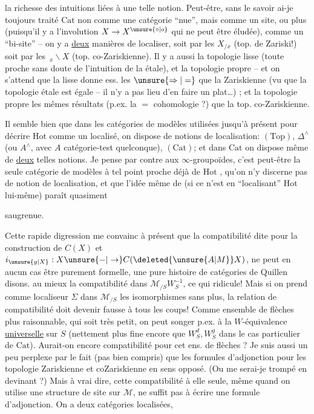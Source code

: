  la richesse des intuitions liées à une telle notion. Peut-être, sans le savoir ai-je toujours traité $\mathrm{Cat}$ non comme une catégorie ``nue'', mais comme un site, ou plus  (puisqu'il y a l'involution $X\to X^{\unsure{\circ|o}}$ qui ne peut être éludée), comme un ``bi-site'' -- on y a \uline{deux} manières de localiser,  soit par les $X_{/x}$ (top. de Zariski!) soit par les $\,{}_x\backslash X$ (top. co-Zariskienne). Il y a aussi la topologie lisse (toute proche sans doute de l'intuition de la  étale), et la topologie propre -- et on s'attend que la lisse donne ess. les $\unsure{\Rightarrow|=}$  que la Zariskienne  (vu que la topologie étale  est égale -- il n'y a pas lieu d'en faire un plat\ldots) ; et la topologie propre les mêmes résultats (p.ex. la $=$ cohomologie ?) que la top. co-Zariskienne.

Il semble bien que dans  les catégories de modèles utilisées jusqu'à présent pour décrire $\mathrm{Hot}$ comme un localisé, on dispose de notions de localisation: $(\mathrm{Top})$, $\Delta^\wedge$ (ou $A^\wedge$, avec $A$ catégorie-test quelconque), $(\mathrm{Cat})$; et dans $\mathrm{Cat}$ on dispose même de \uline{deux} telles notions. Je pense par contre aux $\infty$-groupoïdes, c'est peut-être la seule catégorie de modèles à tel point proche déjà de $\mathrm{Hot}$ , qu'on n'y discerne pas de notion de localisation, et que l'idée même de   (si ce n'est en ``localisant'' $\mathrm{Hot}$ lui-même) paraît quasiment

saugrenue.

Cette rapide digression me convainc à présent que la compatibilité dite pour la construction de $C(X)$ et $i_{\unsure{y|X}}:X\unsure{-|\to}C(\deleted{\unsure{A|M}}X)$, ne peut en aucun cas être purement formelle, une pure histoire de catégories de Quillen disons.    au mieux la compatibilité dans $\mathcal M_{/S}W_S^{-1}$, ce qui  ridicule!  Mais si on prend comme localiseur $\Sigma$ dans $\mathcal M_{/S}$ les isomorphismes sans plus, la relation de compatibilité doit devenir fausse à tous les coups! Comme ensemble de flèches  plus raisonnable, qui soit  très petit, on peut songer p.ex. à la $W$-équivalence \uline{universelle} sur $S$ (nettement plus fine encore que $W_S^d,W_S^g$ dans le cas particulier de $\mathrm{Cat}$). Aurait-on encore compatibilité pour cet ens. de flèches ? Je suis aussi un peu perplexe par le fait (pas bien compris) que les formules d'adjonction pour les topologie Zariskienne et coZariskienne  en sens opposé. (Ou me serai-je trompé en devinant  ?) Mais à vrai dire, cette compatibilité à elle seule, même quand on utilise une structure de site sur $\mathcal M$, ne suffit pas à écrire une formule d'adjonction. On a deux catégories localisées,

